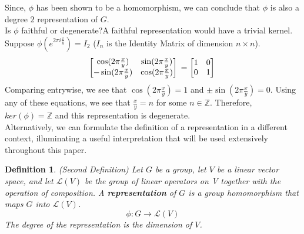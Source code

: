 \documentclass[10pt]{ucthesis}
\newtheorem{definition}{Definition}[chapter]
\begin{document}
	Since, $\phi$ has been shown to be a homomorphism, we can conclude that $\phi$ is also a degree $2$ representation of $G$.\\

	\noindent Is $\phi$ faithful or degenerate?A faithful representation would have a trivial kernel. Suppose $\phi(e^{2\pi i\frac{x}{y}}) = I_2$ ($I_n$ is the Identity Matrix of dimension $n\times n$). 
	\begin{equation}
			\begin{bmatrix}
				\cos(2\pi\frac{x}{y}) & \sin(2\pi\frac{x}{y}) \\
				-\sin(2\pi\frac{x}{y}) & \cos(2\pi\frac{x}{y})
			\end{bmatrix}\\
			= \begin{bmatrix}
				1 & 0 \\
				0 & 1 \\
			\end{bmatrix}\\
	\end{equation}
	\noindent Comparing entrywise, we see that $\cos(2\pi\frac{x}{y}) = 1$ and $\pm\sin(2\pi\frac{x}{y}) = 0$. Using any of these equations, we see that $\frac{x}{y}= n$ for some $n\in\mathbb{Z}$. Therefore, $ker(\phi)=\mathbb{Z}$ and this representation is degenerate.\\


Alternatively, we can formulate the definition of a representation in a different context, illuminating a useful interpretation that will be used extensively throughout this paper.

\begin{definition}
	(Second Definition) Let $G$ be a group, let $V$ be a linear vector space, and let $\mathcal{L}(V)$ be the group of linear operators on V together with the operation of composition. A \textbf{representation} of $G$ is a group homomorphism that maps $G$ into $\mathcal{L}(V)$.
	$$\phi : G \rightarrow \mathcal{L}(V)$$
The degree of the representation is the dimension of $V$.
\end{definition}
\end{document}
